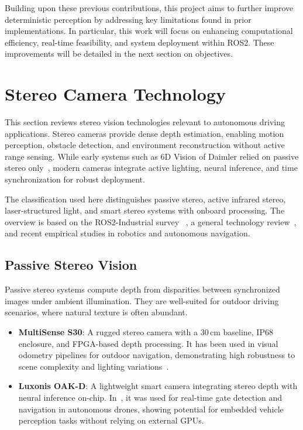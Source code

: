 Building upon these previous contributions, this project aims to further improve deterministic perception by 
addressing key limitations found in prior implementations. 
In particular, this work will focus on enhancing computational efficiency, real-time feasibility, 
and system deployment within ROS2. These improvements will be detailed in the next section on objectives.

\section{Stereo Camera Technology}\label{sec:StereoCameraTechnology}

This section reviews stereo vision technologies relevant to autonomous driving
applications. Stereo cameras provide dense depth estimation, enabling motion
perception, obstacle detection, and environment reconstruction without active
range sensing. While early systems such as 6D Vision of Daimler relied on passive
stereo only~\cite{6d_vision_daimler}, modern cameras integrate active lighting,
neural inference, and time synchronization for robust deployment.

The classification used here distinguishes passive stereo, active infrared
stereo, laser-structured light, and smart stereo systems with onboard
processing. The overview is based on the ROS2-Industrial survey
~\cite{rosindustrialCameraSurvey}, a general technology review~\cite{stereoCameraTech},
and recent empirical studies in robotics and autonomous navigation.

\subsection{Passive Stereo Vision}\label{sec:PassiveStereoVision}

Passive stereo systems compute depth from disparities between synchronized
images under ambient illumination. They are well-suited for outdoor driving
scenarios, where natural texture is often abundant.

\begin{itemize}
  \item \textbf{MultiSense S30}: A rugged stereo camera with a 30\,cm baseline,
  IP68 enclosure, and FPGA-based depth processing. It has been used in visual
  odometry pipelines for outdoor navigation, demonstrating high robustness to
  scene complexity and lighting variations~\cite{paperCarnegie}.

  \item \textbf{Luxonis OAK-D}: A lightweight smart camera integrating stereo
  depth with neural inference on-chip. In~\cite{paperLuxonis}, it was used for
  real-time gate detection and navigation in autonomous drones, showing
  potential for embedded vehicle perception tasks without relying on external
  GPUs.
\end{itemize}

